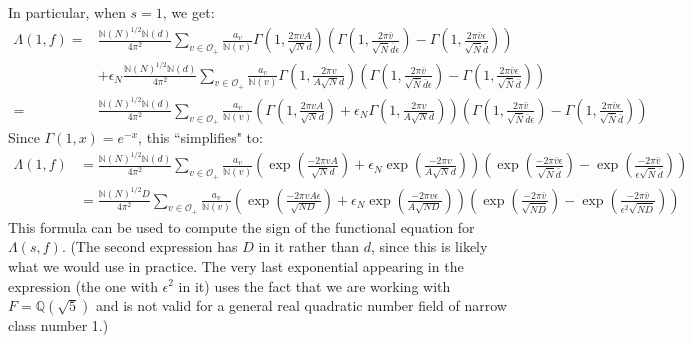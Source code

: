 \documentclass{article}
\theoremstyle{plain}
\begin{document}
In particular, when $s=1$, we get:
\begin{equation*}
\begin{split}
\Lambda(1,f)= & \frac{\mathbb{N}(N)^{1/2}\mathbb{N}(d)}{4\pi^2} \sum_{v \in \mathcal{O}_+} \frac{a_v}{\mathbb{N}(v)} \Gamma\left(1, \frac{2\pi v A}{\sqrt{N}d}\right) \left(\Gamma\left(1,\frac{2 \pi \bar{v}}{\sqrt{\bar{N}}\bar{d} \epsilon} \right)-  \Gamma\left(1,\frac{2 \pi \bar{v}\epsilon}{\sqrt{\bar{N}}\bar{d} } \right) \right) \\
&+  \epsilon_N \frac{\mathbb{N}(N)^{1/2}\mathbb{N}(d)}{4\pi^2} \sum_{v \in \mathcal{O}_+} \frac{a_v}{\mathbb{N}(v)} \Gamma\left(1, \frac{2\pi v }{A\sqrt{N}d}\right) \left(\Gamma\left(1,\frac{2 \pi \bar{v}}{\sqrt{\bar{N}}\bar{d} \epsilon} \right)-  \Gamma\left(1,\frac{2 \pi \bar{v}\epsilon}{\sqrt{\bar{N}}\bar{d} } \right) \right)\\
= &  \frac{\mathbb{N}(N)^{1/2}\mathbb{N}(d)}{4\pi^2} \sum_{v \in \mathcal{O}_+} \frac{a_v}{\mathbb{N}(v)} \left( \Gamma\left(1, \frac{2\pi v A}{\sqrt{N}d}\right) +\epsilon_N\Gamma\left(1, \frac{2\pi v }{A\sqrt{N}d}\right) \right)\left(\Gamma\left(1,\frac{2 \pi \bar{v}}{\sqrt{\bar{N}}\bar{d} \epsilon} \right)-  \Gamma\left(1,\frac{2 \pi \bar{v}\epsilon}{\sqrt{\bar{N}}\bar{d} } \right) \right)
\end{split}
\end{equation*}
Since $\Gamma(1,x)=e^{-x}$, this ``simplifies" to:
\begin{align*}
\Lambda(1,f) & = \frac{\mathbb{N}(N)^{1/2} \mathbb{N}(d)}{4\pi^2} \sum_{v \in \mathcal{O}_+} \frac{a_v}{\mathbb{N}(v)} \left( \exp\left(\frac{-2\pi vA}{\sqrt{N} d}\right) + \epsilon_N \exp\left(\frac{-2\pi v}{A\sqrt{N} d}\right) \right) \left( \exp \left(\frac{-2\pi \bar{v} \epsilon}{\sqrt{\bar{N}}\bar{d}}\right) -  \exp \left(\frac{-2\pi \bar{v}}{\epsilon\sqrt{\bar{N}}\bar{d}}\right)\right)\\
& = \frac{\mathbb{N}(N)^{1/2} D}{4\pi^2} \sum_{v \in \mathcal{O}_+} \frac{a_v}{\mathbb{N}(v)} \left( \exp\left(\frac{-2\pi vA\epsilon}{\sqrt{ND} }\right) + \epsilon_N \exp\left(\frac{-2\pi v\epsilon}{A\sqrt{ND}}\right) \right) \left( \exp \left(\frac{-2\pi \bar{v} }{\sqrt{\bar{N}D}}\right) -  \exp \left(\frac{-2\pi \bar{v}}{\epsilon^2\sqrt{\bar{N}D}}\right)\right)
\end{align*}
This formula can be used to compute the sign of the functional equation for $\Lambda(s,f)$. (The second expression has $D$ in it rather than $d$, since this is likely what we would use in practice. The very last exponential appearing in the expression (the one with $\epsilon^2$ in it) uses the fact that we are working with $F=\mathbb{Q}(\sqrt{5})$ and is not valid for a general real quadratic number field of narrow class number 1.)
\end{document}
